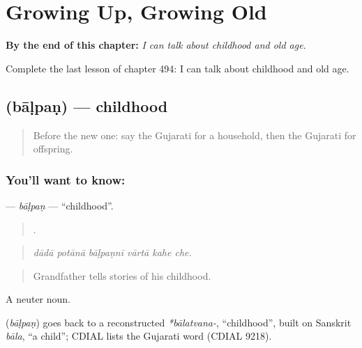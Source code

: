 
\chapter{Growing Up, Growing Old}
\label{ch:gu-growing-up-growing-old}

\begin{chapteropening}
\textbf{By the end of this chapter:} \emph{I can talk about childhood and old age.}

Complete the last lesson of chapter 494: I can talk about childhood and old age.
\end{chapteropening}

\section[\texorpdfstring{\gu{બાળપણ} (bāḷpaṇ)}{બાળપણ (bāḷpaṇ)}]{ (bāḷpaṇ) — childhood}

\label{lesson:GU-C494-balpan}



\begin{quote}
Before the new one: say the Gujarati for a household, then the Gujarati for offspring.
\end{quote}

\subsection*{You'll want to know: }
\textbf{} — \emph{bāḷpaṇ} — \textquotedblleft{}childhood\textquotedblright{}.

\begin{quote}
     .
\end{quote}

\begin{quote}
\emph{dādā potānā bāḷpaṇnī vārtā kahe che.}
\end{quote}

\begin{quote}
Grandfather tells stories of his childhood.
\end{quote}

A neuter noun.

\begin{cousinweb}
\textbf{} (\emph{bāḷpaṇ}) goes back to a reconstructed \emph{*bālatvana-}, \textquotedblleft{}childhood\textquotedblright{}, built on Sanskrit \emph{bāla}, \textquotedblleft{}a child\textquotedblright{}; CDIAL lists the Gujarati word (CDIAL 9218).
\end{cousinweb}

